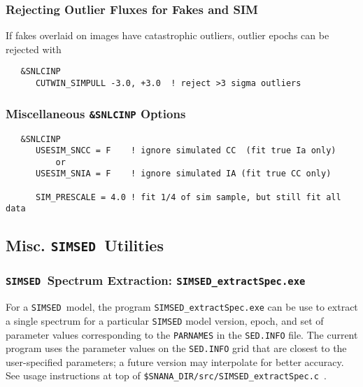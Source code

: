 \documentclass[12pt]{article}
\newcommand{\SIMSED}{{\tt SIMSED}}
\begin{document}
  \subsubsection{Rejecting Outlier Fluxes for Fakes and SIM}
  \label{sss:reject_outliers}

If fakes overlaid on images have catastrophic outliers,
outlier epochs can be rejected with
\begin{verbatim}
   &SNLCINP
      CUTWIN_SIMPULL -3.0, +3.0  ! reject >3 sigma outliers
\end{verbatim}


  \subsubsection{Miscellaneous {\tt \&SNLCINP} Options}
  \label{sss:misc_SNLCINP}

\begin{verbatim}
   &SNLCINP
      USESIM_SNCC = F    ! ignore simulated CC  (fit true Ia only)
          or
      USESIM_SNIA = F    ! ignore simulated IA (fit true CC only)

      SIM_PRESCALE = 4.0 ! fit 1/4 of sim sample, but still fit all data
\end{verbatim}


  \bigskip\bigskip
  \subsection{Misc. \SIMSED\ Utilities}
  \label{subsec:SIMSED_utils}

  \subsubsection{\SIMSED\ Spectrum Extraction:   
    {\tt SIMSED\_extractSpec.exe}  }
  \label{sssec:SIMSED_extract}

For a \SIMSED\ model, the program
{\tt SIMSED\_extractSpec.exe} can be use to extract
a single spectrum for a particular  {\SIMSED} model version,
epoch, and set of parameter values corresponding to the
{\tt PARNAMES} in the {\tt SED.INFO} file.
The current program uses the parameter values on the
{\tt SED.INFO} grid that are closest to the user-specified
parameters; a future version may interpolate for better
accuracy.
See usage instructions at top of
{\tt \$SNANA\_DIR/src/SIMSED\_extractSpec.c}~.
\end{document}
